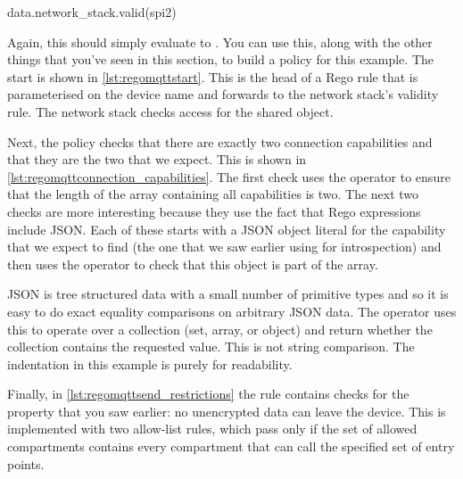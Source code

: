 \begin{regosnippet}
data.network_stack.valid(spi2)
\end{regosnippet}

Again, this should simply evaluate to .
You can use this, along with the other things that you've seen in this section, to build a policy for this example.
The start is shown in \ref{lst:regomqttstart}.
This is the head of a Rego rule that is parameterised on the device name and forwards to the network stack's validity rule.
The network stack checks access for the shared object.

\regolisting[filename=examples/mqtt/mqtt.rego,marker=network_stack,label=lst:regomqttstart,caption="The start of the Rego policy for the MQTT example."]{}

Next, the policy checks that there are exactly two connection capabilities and that they are the two that we expect.
This is shown in \ref{lst:regomqttconnection_capabilities}.
The first check uses the  operator to ensure that the length of the array containing all capabilities is two.
The next two checks are more interesting because they use the fact that Rego expressions include JSON.
Each of these starts with a JSON object literal for the capability that we expect to find (the one that we saw earlier using  for introspection) and then uses the  operator to check that this object is part of the array.

JSON is tree structured data with a small number of primitive types and so it is easy to do exact equality comparisons on arbitrary JSON data.
The  operator uses this to operate over a collection (set, array, or object) and return whether the collection contains the requested value.
This is not string comparison.
The indentation in this example is purely for readability.

\regolisting[filename=examples/mqtt/mqtt.rego,marker=connection_capabilities,label=lst:regomqttconnection_capabilities,caption="Rego rules for restricting output in the MQTT example."]{}

Finally, in \ref{lst:regomqttsend_restrictions} the rule contains checks for the property that you saw earlier: no unencrypted data can leave the device.
This is implemented with two allow-list rules, which pass only if the set of allowed compartments contains every compartment that can call the specified set of entry points.

\regolisting[filename=examples/mqtt/mqtt.rego,marker=send_restrictions,label=lst:regomqttsend_restrictions,caption="Rego rules to ensure that no data leaves the device unencrypted for the MQTT example."]{}

